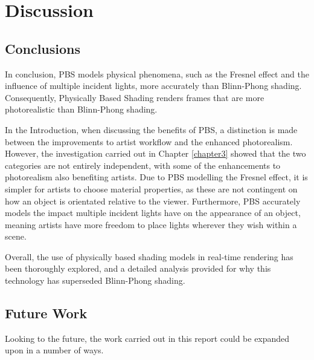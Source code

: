 \chapter{Discussion}
\label{chapter4}

\section{Conclusions}

In conclusion, PBS models physical phenomena, such as the Fresnel effect and the influence of multiple incident lights, more accurately than Blinn-Phong shading. Consequently, Physically Based Shading renders frames that are more photorealistic than Blinn-Phong shading.

In the Introduction, when discussing the benefits of PBS, a distinction is made between the improvements to artist workflow and the enhanced photorealism. However, the investigation carried out in Chapter \ref{chapter3} showed that the two categories are not entirely independent, with some of the enhancements to photorealism also benefiting artists. Due to PBS modelling the Fresnel effect, it is simpler for artists to choose material properties, as these are not contingent on how an object is orientated relative to the viewer. Furthermore, PBS accurately models the impact multiple incident lights have on the appearance of an object, meaning artists have more freedom to place lights wherever they wish within a scene.

Overall, the use of physically based shading models in real-time rendering has been thoroughly explored, and a detailed analysis provided for why this technology has superseded Blinn-Phong shading.

\section{Future Work}

Looking to the future, the work carried out in this report could be expanded upon in a number of ways.


